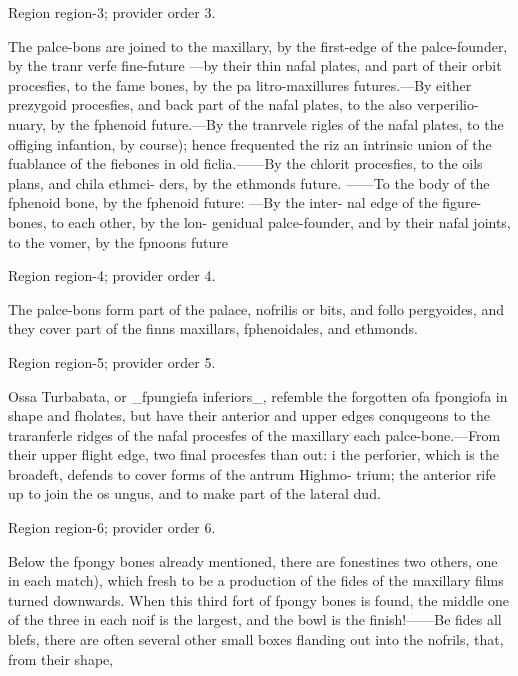\documentclass[11pt]{article}
\begin{document}
{\scriptsize\color{gray} Region region-3; provider order 3.\par}
\medskip

The palce-bons are joined to the maxillary, by
the first-edge of the palce-founder, by the tranr
verfe fine-future —by their thin nafal plates, and part
of their orbit procesfies, to the fame bones, by the pa
litro-maxillures futures.—By either prezygoid procesfies,
and back part of the nafal plates, to the also verperilio-
nuary, by the fphenoid future.—By the tranrvele rigles
of the nafal plates, to the offiging infantion, by
course); hence frequented the riz an intrinsic union of
the fuablance of the fiebones in old ficlia.——By the
chlorit procesfies, to the oils plans, and chila ethmci-
ders, by the ethmonds future. ——To the body of the
fphenoid bone, by the fphenoid future: —By the inter-
nal edge of the figure-bones, to each other, by the lon-
genidual palce-founder, and by their nafal joints, to the
vomer, by the fpnoons future
\par

{\scriptsize\color{gray} Region region-4; provider order 4.\par}
\medskip

The palce-bons form part of the palace, nofrilis or
bits, and follo pergyoides, and they cover part of the
finns maxillars, fphenoidales, and ethmonds.
\par

{\scriptsize\color{gray} Region region-5; provider order 5.\par}
\medskip

Ossa Turbabata, or \_fpungiefa inferiors\_, refemble
the forgotten ofa fpongiofa in shape and fholates, but
have their anterior and upper edges conqugeons to the
traranferle ridges of the nafal procesfes of the maxillary
each palce-bone.—From their upper flight edge,
two final procesfes than out: i the perforier, which is the
broadeft, defends to cover forms of the antrum Highmo-
trium; the anterior rife up to join the os ungus, and
to make part of the lateral dud.
\par

{\scriptsize\color{gray} Region region-6; provider order 6.\par}
\medskip

Below the fpongy bones already mentioned, there are
fonestines two others, one in each match), which fresh
to be a production of the fides of the maxillary films
turned downwards. When this third fort of fpongy
bones is found, the middle one of the three in each noif
is the largest, and the bowl is the finish!——Be
fides all blefs, there are often several other small boxes
flanding out into the nofrils, that, from their shape,
\par
\end{document}
